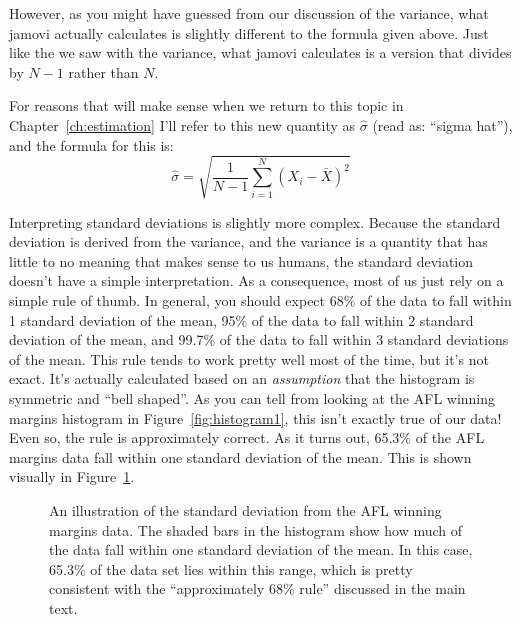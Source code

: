 However, as you might have guessed from our discussion of the variance, what jamovi actually calculates is slightly different to the formula given above. Just like the we saw with the variance, what jamovi calculates is a version that divides by $N-1$ rather than $N$. 

\vspace{0.5cm}
\begin{mdframed}[style=MyFrame,nobreak=true]
For reasons that will make sense when we return to this topic in Chapter~\ref{ch:estimation} I'll refer to this new quantity as $\hat\sigma$ (read as: ``sigma hat''), and the formula for this is:
$$
\hat\sigma = \sqrt{ \frac{1}{N-1} \sum_{i=1}^N \left( X_i - \bar{X} \right)^2 }
$$

\end{mdframed}

Interpreting standard deviations is slightly more complex. Because the standard deviation is derived from the variance, and the variance is a quantity that has little to no meaning that makes sense to us humans, the standard deviation doesn't have a simple interpretation. As a consequence, most of us just rely on a simple rule of thumb. In general, you should expect 68\% of the data to fall within 1 standard deviation of the mean, 95\% of the data to fall within 2 standard deviation of the mean, and 99.7\% of the data to fall within 3 standard deviations of the mean. This rule tends to work pretty well most of the time, but it's not exact. It's actually calculated based on an {\it assumption} that the histogram is symmetric and ``bell shaped''. As you can tell from looking at the AFL winning margins histogram in Figure~\ref{fig:histogram1}, this isn't exactly true of our data! Even so, the rule is approximately correct. As it turns out, 65.3\% of the AFL margins data fall within one standard deviation of the mean. This is shown visually in Figure~\ref{fig:aflsd}.

\begin{figure}[htb]
\begin{center}
\caption{An illustration of the standard deviation from the AFL winning margins data. The shaded bars in the histogram show how much of the data fall within one standard deviation of the mean. In this case, 65.3\% of the data set lies within this range, which is pretty consistent with the ``approximately 68\% rule'' discussed in the main text.}
\label{fig:aflsd}
\HR
\end{center}
\end{figure}

